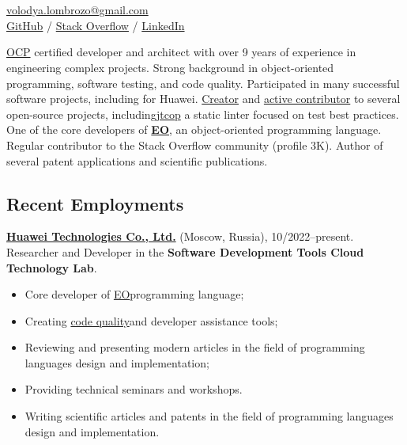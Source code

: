 \documentclass{vl}
\begin{document}
    \vlPrintPhoto{}

    \section*{\Large {}}

    \href{mailto:volodya.lombrozo@gmail.com}{volodya.lombrozo@gmail.com}\\%
    \href{https://github.com/volodya-lombrozo}{GitHub} /
    \href{https://stackoverflow.com/users/10423604/volodya-lombrozo}{Stack Overflow} /
    \href{https://www.linkedin.com/in/vladimir-zakharov-lombrozo-b71744216/}{LinkedIn}

    \vspace*{12pt}

    \href{https://catalog-education.oracle.com/pls/certview/sharebadge?id=87F6A2FE819A5A5AF4120A05900AB28A461EE9A3EE9FBFA02721FADAEB3BCE19}{OCP}
    certified developer and architect with over 9 years of experience in engineering complex projects.
    Strong background in object-oriented programming, software testing, and code quality.
    Participated in many successful software projects, including for Huawei.
    \href{https://github.com/volodya-lombrozo?tab=repositories}{Creator} and
    \href{https://github.com/volodya-lombrozo}{active contributor} to several open-source projects,
    including\href{https://github.com/volodya-lombrozo/jtcop}{jtcop} a static linter focused on test best practices.
    One of the core developers of \textbf{\href{https://www.eolang.org}{EO}}, an object-oriented programming language.
    Regular contributor to the Stack Overflow community (profile 3K).
    Author of several patent applications and scientific publications.

    \subsection*{Recent Employments}

    \textbf{\href{https://www.huawei.com}{Huawei Technologies Co., Ltd.}} (Moscow, Russia), 10/2022--present.
    Researcher and Developer in the \textbf{Software Development Tools Cloud Technology Lab}.

    \begin{itemize}
        \itemsep0em
        \item Core developer of \href{https://github.com/objectionary/eo}{EO}programming language;
        \item
        Creating \href{https://github.com/volodya-lombrozo/jtcop}{code quality}and developer assistance tools;
        \item Reviewing and presenting modern articles in the field of programming languages design and implementation;
        \item Providing technical seminars and workshops.
        \item Writing scientific articles and patents in the field of programming languages design and implementation.
    \end{itemize}
\end{document}
